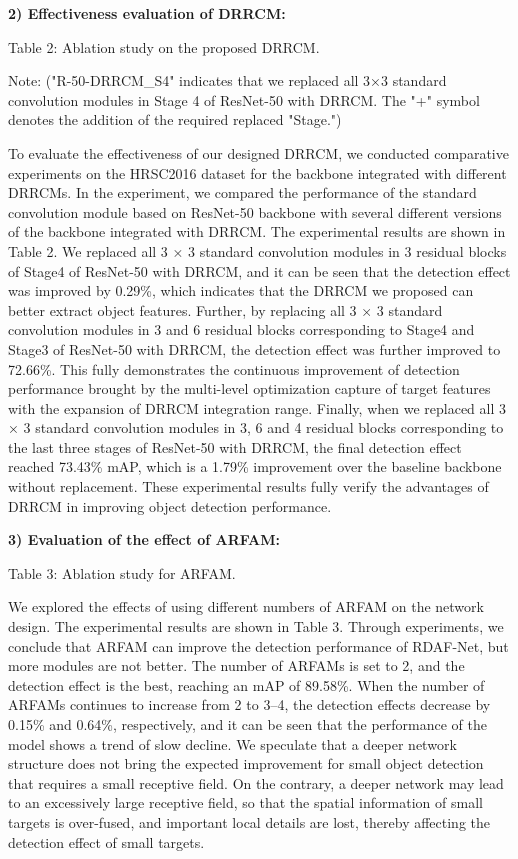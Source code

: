 \documentclass[journal]{IEEEtran}
\begin{document}
\textbf{2) Effectiveness evaluation of DRRCM:}

Table 2: Ablation study on the proposed DRRCM.

Note: ("R-50-DRRCM\_S4" indicates that we replaced all 3×3 standard convolution modules in Stage 4 of ResNet-50 with DRRCM. The "+" symbol denotes the addition of the required replaced "Stage.")

To evaluate the effectiveness of our designed DRRCM, we conducted comparative experiments on the HRSC2016 dataset for the backbone integrated with different DRRCMs. In the experiment, we compared the performance of the standard convolution module based on ResNet-50 backbone with several different versions of the backbone integrated with DRRCM. The experimental results are shown in Table 2. We replaced all 3 × 3 standard convolution modules in 3 residual blocks of Stage4 of ResNet-50 with DRRCM, and it can be seen that the detection effect was improved by 0.29\%, which indicates that the DRRCM we proposed can better extract object features. Further, by replacing all 3 × 3 standard convolution modules in 3 and 6 residual blocks corresponding to Stage4 and Stage3 of ResNet-50 with DRRCM, the detection effect was further improved to 72.66\%. This fully demonstrates the continuous improvement of detection performance brought by the multi-level optimization capture of target features with the expansion of DRRCM integration range. Finally, when we replaced all 3 × 3 standard convolution modules in 3, 6 and 4 residual blocks corresponding to the last three stages of ResNet-50 with DRRCM, the final detection effect reached 73.43\% mAP, which is a 1.79\% improvement over the baseline backbone without replacement. These experimental results fully verify the advantages of DRRCM in improving object detection performance.

\textbf{3) Evaluation of the effect of ARFAM:}

Table 3: Ablation study for ARFAM.

We explored the effects of using different numbers of ARFAM on the network design. The experimental results are shown in Table 3. Through experiments, we conclude that ARFAM can improve the detection performance of RDAF-Net, but more modules are not better. The number of ARFAMs is set to 2, and the detection effect is the best, reaching an mAP of 89.58\%. When the number of ARFAMs continues to increase from 2 to 3–4, the detection effects decrease by 0.15\% and 0.64\%, respectively, and it can be seen that the performance of the model shows a trend of slow decline. We speculate that a deeper network structure does not bring the expected improvement for small object detection that requires a small receptive field. On the contrary, a deeper network may lead to an excessively large receptive field, so that the spatial information of small targets is over-fused, and important local details are lost, thereby affecting the detection effect of small targets.
\end{document}
